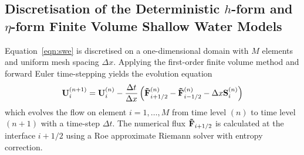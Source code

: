 \subsection{Discretisation of the Deterministic $h$-form and $\eta$-form Finite Volume Shallow Water Models}
Equation~\eqref{eqn:swe} is discretised on a one-dimensional domain with $M$ elements and uniform mesh spacing $\Delta x$.
Applying the first-order finite volume method and forward Euler time-stepping yields the evolution equation
\begin{align}
    \mathbf{U}_i^{(n+1)} = \mathbf{U}_i^{(n)} - \frac{\Delta t}{\Delta x}
    \left( \mathbf{\tilde{F}}_{i+1/2}^{(n)} - \mathbf{\tilde{F}}_{i-1/2}^{(n)}
    - \Delta x \mathbf{S}_i^{(n)} \right) \label{eqn:swe-discrete}
\end{align}
which evolves the flow on element $i = 1, \ldots, M$ from time level $(n)$ to time level $(n+1)$ with a time-step $\Delta t$.  
The numerical flux $\mathbf{\tilde{F}}_{i+1/2}$ is calculated at the interface $i+1/2$  using a Roe approximate Riemann solver with entropy correction.

